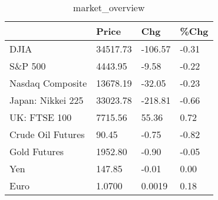 \documentclass{article}%
\begin{document}
%


\begin{table}[htbp]%
\caption{market\_overview}%
\centering%
\begin{adjustbox}{width=1\textwidth}%
\begin{tabular}{llll}
\toprule
                  &    Price &     Chg &  \%Chg \\
\midrule
             DJIA & 34517.73 & -106.57 & -0.31 \\
          S\&P 500 &  4443.95 &   -9.58 & -0.22 \\
 Nasdaq Composite & 13678.19 &  -32.05 & -0.23 \\
Japan: Nikkei 225 & 33023.78 & -218.81 & -0.66 \\
     UK: FTSE 100 &  7715.56 &   55.36 &  0.72 \\
Crude Oil Futures &    90.45 &   -0.75 & -0.82 \\
     Gold Futures &  1952.80 &   -0.90 & -0.05 \\
              Yen &   147.85 &   -0.01 &  0.00 \\
             Euro &   1.0700 &  0.0019 &  0.18 \\
\bottomrule
\end{tabular}
%
\end{adjustbox}%
\end{table}

%
\end{document}

